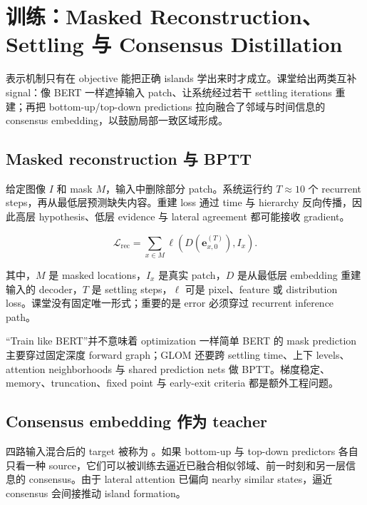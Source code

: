 \section{训练：Masked Reconstruction、Settling 与 Consensus Distillation}

表示机制只有在 objective 能把正确 islands 学出来时才成立。课堂给出两类互补 signal：像 BERT 一样遮掉输入 patch、让系统经过若干 settling iterations 重建；再把 bottom-up/top-down predictions 拉向融合了邻域与时间信息的 consensus embedding，以鼓励局部一致区域形成。

\subsection{Masked reconstruction 与 BPTT}

给定图像 $I$ 和 mask $M$，输入中删除部分 patch。系统运行约 $T\approx10$ 个 recurrent steps，再从最低层预测缺失内容。重建 loss 通过 time 与 hierarchy 反向传播，因此高层 hypothesis、低层 evidence 与 lateral agreement 都可能接收 gradient。


\[
\mathcal L_{\mathrm{rec}}=
\sum_{x\in M}
\ell\!\left(D\!\left(\mathbf e_{x,0}^{(T)}\right),I_x\right).
\]

其中，$M$ 是 masked locations，$I_x$ 是真实 patch，$D$ 是从最低层 embedding 重建输入的 decoder，$T$ 是 settling steps，$\ell$ 可是 pixel、feature 或 distribution loss。课堂没有固定唯一形式；重要的是 error 必须穿过 recurrent inference path。

\begin{warningbox}{“Train like BERT”并不意味着 optimization 一样简单}
BERT 的 mask prediction 主要穿过固定深度 forward graph；GLOM 还要跨 settling time、上下 levels、attention neighborhoods 与 shared prediction nets 做 BPTT。梯度稳定、memory、truncation、fixed point 与 early-exit criteria 都是额外工程问题。
\end{warningbox}

\subsection{Consensus embedding 作为 teacher}

四路输入混合后的 target 被称为 。如果 bottom-up 与 top-down predictors 各自只看一种 source，它们可以被训练去逼近已融合相似邻域、前一时刻和另一层信息的 consensus。由于 lateral attention 已偏向 nearby similar states，逼近 consensus 会间接推动 island formation。

